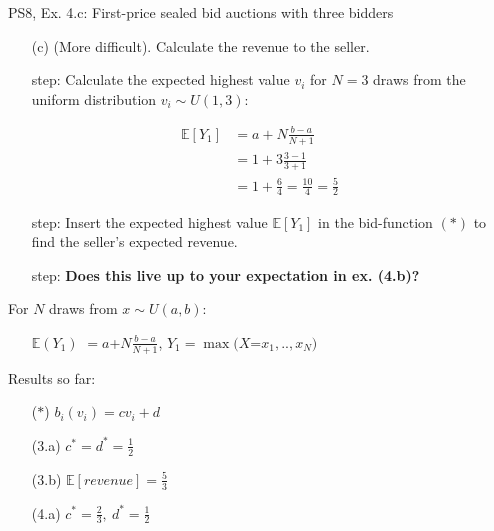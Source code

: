 \begin{frame}{PS8, Ex. 4.c: First-price sealed bid auctions with three bidders}
    \begin{itemize}
      \item[(c)] (More difficult). Calculate the revenue to the seller.
    \end{itemize}
    \vspace{-10pt}
    \begin{multicols}{2}
      \begin{itemize}
        \item[\nth{1} step:] Calculate the expected highest value $v_i$ for $N=3$ draws from the uniform distribution $v_i\sim U(1,3)$:
      \end{itemize}
      \vspace{-8pt}
      \begin{align*}
        \mathbb{E}[Y_1]&=a+N\frac{b-a}{N+1}\\
                       &=1+3\frac{3-1}{3+1}\\
                       &=1+\frac{6}{4}=\frac{10}{4}=\frac{5}{2}
      \end{align*}
      \vspace{-12pt}
      \begin{itemize}
        \item[\nth{2} step:] Insert the expected highest value $\mathbb{E}[Y_1]$ in the bid-function $(*)$  to find the seller's expected revenue.
        \item[\nth{3} step:] \textbf{Does this live up to your expectation in ex. (4.b)?}
      \end{itemize}
      \vfill\null\columnbreak
      For $N$ draws from $x\sim U(a, b):$
      \vspace{-6pt}
      \begin{enumerate}
        \item[$\mathbb{E}(Y_1)$] $=a$+$N\frac{b-a}{N+1}$, $Y_1=\max(X$=$x_1,..,x_N)$
      \end{enumerate}
      \vspace{-6pt}
      Results so far:
      \vspace{-6pt}
      \begin{itemize}
        \item[($*$)] $b_i(v_i) = cv_i+d$
        \item[(3.a)] $c^*=d^*=\frac{1}{2}$
        \item[(3.b)] $\mathbb{E}[revenue]=\frac{5}{3}$
        \item[(4.a)] $c^*=\frac{2}{3},\ d^*=\frac{1}{2}$

\end{itemize}
\end{multicols}
\end{frame}
